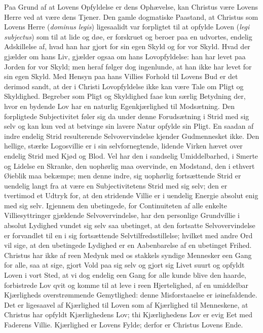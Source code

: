 \documentclass[12pt]{book}
\begin{document}
Paa Grund af at Lovens Opfyldelse er dens Ophævelse, kan Christus
være Lovens Herre ved at være dens Tjener. Den gamle dogmatiske
Paastand, at Christus som Lovens Herre (\textit{dominus legis})
ligesaalidt var forpligtet til at opfylde Loven (\textit{legi
subjectus}) som til at lide og døe, er forskruet og beroer paa en
udvortes, endelig Adskillelse af, hvad han har gjort for sin egen
Skyld og for vor Skyld. Hvad der gjælder om hans Liv, gjælder ogsaa
om hans Lovopfyldelse: han har levet paa Jorden for vor Skyld; men
heraf følger dog ingenlunde, at han ikke har levet for sin egen
Skyld. Med Hensyn paa hans Villies Forhold til Lovens Bud er det
derimod sandt, at der i Christi Lovopfyldelse ikke kan være Tale om
Pligt og Skyldighed. Begreber som Pligt og Skyldighed faae kun
særlig Betydning der, hvor en bydende Lov har en naturlig
Egenkjærlighed til Modsætning. Den forpligtede Subjectivitet føler
sig da under denne Forudsætning i Strid med sig selv og kan kun ved
at betvinge sin lavere Natur opfylde sin Pligt. En saadan af indre
endelig Strid resulterende Selvovervindelse kjender Gudmennesket
ikke. Den hellige, stærke Logosvillie er i sin selvfornegtende,
lidende Virken hævet over endelig
Strid med Kjød og Blod. Vel har den i sandselig Umiddelbarhed, i
Smerte og Lidelse en Skranke, den uophørlig maa overvinde, en
Modstand, den i ethvert Øieblik maa bekæmpe; men denne indre, sig
uophørlig fortsættende Strid er uendelig langt fra at være en
Subjectivitetens Strid med sig selv; den er tvertimod et Udtryk for,
at den stridende Villie er i uendelig Energie absolut enig med sig
selv. Igjennem den ubetingede, for Continuiteten af alle enkelte
Villiesyttringer gjældende Selvovervindelse, har den personlige
Grundvillie i absolut Lydighed vundet sig selv saa ubetinget, at den
fortsatte Selvovervindelse er forvandlet til en i sig fortsættende
Selvtilfredsstillelse; hvilket med andre Ord vil sige, at den
ubetingede Lydighed er en Aabenbarelse af en ubetinget Frihed.
Christus har ikke af reen Medynk med os stakkels syndige Mennesker
een Gang for alle, saa at sige, gjort Vold paa sig selv og gjort sig
Livet suurt og opfyldt Loven i vort Sted, at vi dog endelig een Gang
for alle kunde blive den haarde, forbistrede Lov qvit og komme til
at leve i reen Hjertelighed, af en umiddelbar Kjærligheds
overstrømmende Gemytlighed: denne Misforstaaelse er iøinefaldende.
Det er ligesaavel af Kjærlighed til Loven som af Kjærlighed til
Menneskene, at Christus har opfyldt Kjærlighedens Lov; thi
Kjærlighedens Lov er evig Eet med Faderens Villie. Kjærlighed er
Lovens Fylde; derfor er Christus Lovens Ende.
\end{document}
